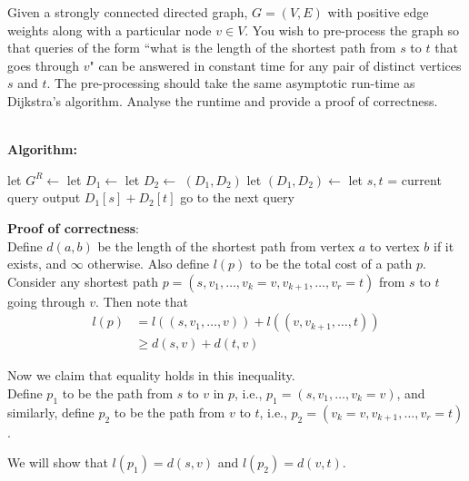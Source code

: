 \documentclass[answers]{exam}
\newcommand{\nl}{\vspace{0.2cm}\\}
\newcommand{\nln}{\vspace{0.2cm}}
\begin{document}
\begin{questions}
 
\question[12] Given a strongly connected directed graph, $G = (V, E)$ with positive edge weights along with a particular node $v \in V$. 
You wish to pre-process the graph so that queries of the form ``what is the length of the shortest path from $s$ to $t$ that goes through $v$" can be answered in constant time for any pair of distinct vertices $s$ and $t$. The pre-processing should take the same asymptotic run-time as Dijkstra's algorithm. Analyse the runtime and provide a proof of correctness.

\begin{solution}\nl
\textbf{Algorithm:}
\begin{algorithmic}[1]
        \State let $G^{R} \gets$ 
        \State let $D_{1} \gets$ 
        \State let $D_{2} \gets$ 
        \State \Return $(D_1, D_2)$
    \EndFunction
        \State let $(D_1, D_2) \gets$ 
            \State let $s, t$ = current query
            \State output $D_1[s] + D_2[t]$
            \State go to the next query
        \EndWhile
    \EndFunction
\end{algorithmic}
\nln

\textbf{Proof of correctness}:\nl
Define $d(a, b)$ be the length of the shortest path from vertex $a$ to vertex $b$ if it exists, and $\infty$ otherwise. Also define $l(p)$ to be the total cost of a path $p$.\nl
Consider any shortest path $p = \left(s, v_1, \dots, v_k = v, v_{k + 1}, \dots, v_{r} = t\right)$ from $s$ to $t$ going through $v$. Then note that
\begin{align*}
    l(p) &= l((s, v_1, \dots, v)) + l((v, v_{k + 1}, \dots, t))\\
         &\ge d(s, v) + d(t, v)
\end{align*}

Now we claim that equality holds in this inequality.\nl
Define $p_1$ to be the path from $s$ to $v$ in $p$, i.e., $p_1 = \left(s, v_1, \dots, v_k = v\right)$, and similarly, define $p_2$ to be the path from $v$ to $t$, i.e., $p_2 = \left(v_k = v, v_{k + 1}, \dots, v_{r} = t\right)$.

We will show that $l(p_1) = d(s, v)$ and $l(p_2) = d(v, t)$.


\end{solution}
\end{questions}
\end{document}
